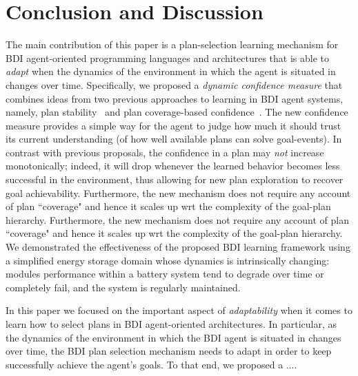\section{Conclusion and Discussion}\label{sec:discussion}

The main contribution of this paper is a plan-selection learning mechanism for BDI agent-oriented programming languages and architectures that is able to \emph{adapt} when the dynamics of the environment in which the agent is situated in changes over time.
Specifically, we proposed a \emph{dynamic confidence measure} that combines ideas from two previous approaches to learning in BDI agent systems, namely, plan stability~\cite{airiau09:enhancing} and plan coverage-based confidence~\cite{singh10:extending}. The new confidence measure provides a simple way for the agent to judge how much it should trust its current understanding (of how well available plans can solve goal-events). 
In contrast with previous proposals, the confidence in a plan may \emph{not} increase monotonically; indeed, it will drop whenever the learned behavior becomes less successful in the environment, thus allowing for new plan exploration to recover goal achievability. Furthermore, the new mechanism does not require any account of plan ``coverage" and hence it scales up wrt the complexity of the goal-plan hierarchy. Furthermore, the new mechanism does not require any account of plan ``coverage" and hence it scales up wrt the complexity of the goal-plan hierarchy.
We demonstrated the effectiveness of the proposed BDI learning framework using a simplified energy storage domain whose dynamics is intrinsically changing: modules performance within a battery system tend to degrade over time or completely fail, and the system is regularly maintained.  

In this paper we focused on the important aspect of \emph{adaptability} when it comes to learn how to select plans in BDI agent-oriented architectures. In particular, as the dynamics of the environment in which the BDI agent is situated in changes over time, the BDI plan selection mechanism needs to adapt in order to keep successfully achieve the agent's goals. 
To that end, we proposed a ....


